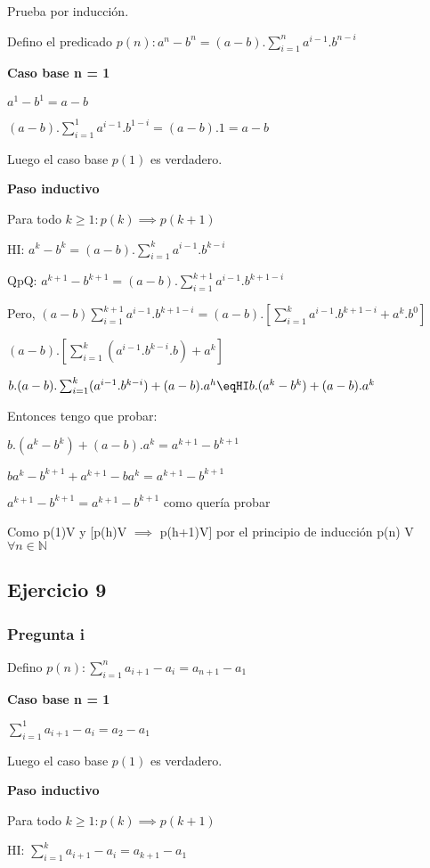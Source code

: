 Prueba por inducción.

Defino el predicado $p(n) : a^n - b^n = (a-b).\sum_{i=1}^{n}a^{i-1}.b^{n-i}$

\textbf{Caso base n = 1}

$ a^1 - b^1 = a-b$

$ (a-b).\sum_{i=1}^{1}a^{i-1}.b^{1-i} = (a-b).1 = a-b$

Luego el caso base $p(1)$ es verdadero.

\textbf{Paso inductivo}

Para todo $k \geq 1: p(k) \implies p(k+1)$

HI: $a^k - b^k = (a-b).\sum_{i=1}^{k}a^{i-1}.b^{k-i}$

QpQ: $a^{k+1} - b^{k+1} = (a-b).\sum_{i=1}^{k+1}a^{i-1}.b^{k+1-i}$

Pero,
$(a-b)\sum_{i=1}^{k+1}a^{i-1}.b^{k+1-i}=(a-b).[\sum_{i=1}^{k}a^{i-1}.b^{k+1-i}+a^k.b^0]$

$(a-b).[\sum_{i=1}^{k}(a^{i-1}.b^{k-i}.b)+a^k]$

$b.(a-b).\sum_{i=1}^{k}(a^{i-1}.b^{k-i})+(a-b).a^h \eqHI b.(a^k-b^k)+(a-b).a^k$

Entonces tengo que probar:

$b.(a^k-b^k)+(a-b).a^k=a^{k+1}-b^{k+1}$

$ba^k-b^{k+1}+a^{k+1}-ba^k = a^{k+1}-b^{k+1}$

$a^{k+1}-b^{k+1}=a^{k+1}-b^{k+1}$ como quería probar

Como p(1)V y [p(h)V $\implies$ p(h+1)V] por el principio de inducción p(n) V $\forall n \in \mathbb{N}$


\subsection{Ejercicio 9}

\subsubsection{Pregunta i}

Defino $p(n) : \sum_{i=1}^{n}a_{i+1}-a_i = a_{n+1} - a_1$

\textbf{Caso base n = 1}

$\sum_{i=1}^{1}a_{i+1}-a_i = a_2 - a_1$

Luego el caso base $p(1)$ es verdadero.

\textbf{Paso inductivo}

Para todo $k \geq 1: p(k) \implies p(k+1)$

HI: $\sum_{i=1}^{k}a_{i+1}-a_i = a_{k+1} - a_1$


